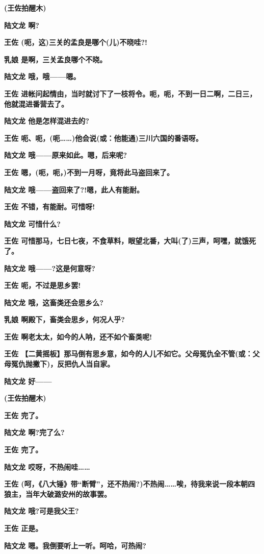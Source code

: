 \textbf{(王佐拍醒木)}

\textbf{陆文龙 啊?}

\textbf{王佐 (呃，这)三关的孟良是哪个(儿)不晓哇?!}

\textbf{乳娘 是啊，三关孟良哪个不晓。}

\textbf{陆文龙 哦，哦------嗯。}

\textbf{王佐
进帐问起情由，当时就讨下了一枝将令。呃，呃，不到一日二啊，二日三，他就混进番营去了。}

\textbf{陆文龙 他是怎样混进去的?}

\textbf{王佐
呃、呃，(呃\ldots{}\ldots{})他会说(或：他能通)三川六国的番语呀。}

\textbf{陆文龙 哦------原来如此。嗯，后来呢?}

\textbf{王佐 嗯，(呃，呃，)不到一月呀，竟将此马盗回来了。}

\textbf{陆文龙 哦------盗回来了?!嗯，此人有能耐。}

\textbf{王佐 不错，有能耐。可惜呀!}

\textbf{陆文龙 可惜什么?}

\textbf{王佐
可惜那马，七日七夜，不食草料，眼望北番，大叫(了)三声，呵嘿，就饿死了。}

\textbf{陆文龙 哦------?这是何意呀?}

\textbf{王佐 呃，不过是思乡罢!}

\textbf{陆文龙 哦，这畜类还会思乡么?}

\textbf{乳娘 啊殿下，畜类会思乡，何况人乎?}

\textbf{王佐 啊老太太，如今的人呐，还不如个畜类呢!}

\textbf{王佐
【二黄摇板】那马倒有思乡意，如今的人儿不如它。父母冤仇全不管(或：父母冤仇抛撇下)，反把仇人当自家。}

\textbf{陆文龙 好------}

\textbf{(王佐拍醒木)}

\textbf{王佐 完了。}

\textbf{陆文龙 啊?完了么?}

\textbf{王佐 完了。}

\textbf{陆文龙 哎呀，不热闹哇\ldots{}\ldots{}}

\textbf{王佐
(呵，《八大锤》带``断臂''，还不热闹?)不热闹\ldots{}\ldots{}唉，待我来说一段本朝四狼主，当年大破潞安州的故事罢。}

\textbf{陆文龙 哦?可是我父王?}

\textbf{王佐 正是。}

\textbf{陆文龙 嗯。我倒要听上一听。呵哈，可热闹?}

